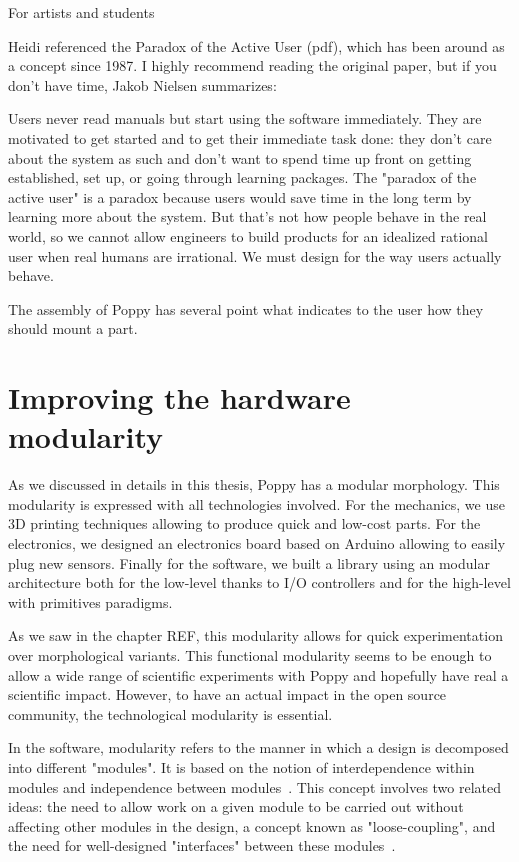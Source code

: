 For artists and students

Heidi referenced the Paradox of the Active User (pdf), which has been around as a concept since 1987. I highly recommend reading the original paper, but if you don't have time, Jakob Nielsen summarizes:

\begin{formal}
Users never read manuals but start using the software immediately. They are motivated to get started and to get their immediate task done: they don't care about the system as such and don't want to spend time up front on getting established, set up, or going through learning packages.
The "paradox of the active user" is a paradox because users would save time in the long term by learning more about the system. But that's not how people behave in the real world, so we cannot allow engineers to build products for an idealized rational user when real humans are irrational. We must design for the way users actually behave.
\end{formal}

The assembly of Poppy has several point what indicates to the user how they should mount a part.


\section{Improving the hardware modularity} %

As we discussed in details in this thesis, Poppy has a modular morphology. This modularity is expressed with all technologies involved. For the mechanics, we use 3D printing techniques allowing to produce quick and low-cost parts. For the electronics, we designed an electronics board based on Arduino allowing to easily plug new sensors. Finally for the software, we built a library using an modular architecture both for the low-level thanks to I/O controllers and for the high-level with primitives paradigms.

As we saw in the chapter REF, this modularity allows for quick experimentation over morphological variants. This functional modularity seems to be enough to allow a wide range of scientific experiments with Poppy and hopefully have real a scientific impact. However, to have an actual impact in the open source community, the technological modularity is essential.

In the software, modularity refers to the manner in which a design is decomposed into different "modules". It is based on the notion of interdependence within modules and independence between modules~\parencite{baldwin2000design}. This concept involves two related ideas: the need to allow work on a given module to be carried out without affecting other modules in the design, a concept known as "loose-coupling", and the need for well-designed "interfaces" between these modules~\parencite{maccormack2006exploring}.

